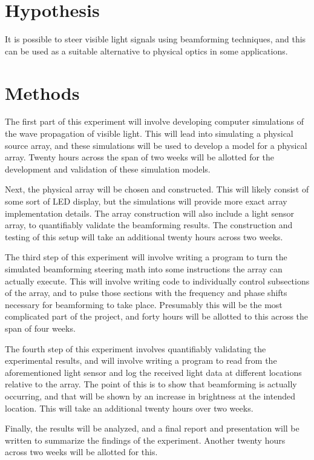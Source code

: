 \documentclass[12pt]{article}
\begin{document}
\section{Hypothesis}
It is possible to steer visible light signals using beamforming techniques, 
and this can be used as a suitable alternative to physical optics in some applications.

\section{Methods}
The first part of this experiment will involve developing computer simulations of the 
wave propagation of visible light. This will lead into simulating a physical source
array, and these simulations will be used to develop a model for a physical array. Twenty
hours across the span of two weeks will be allotted for the development and validation of 
these simulation models. 
\par
Next, the physical array will be chosen and constructed. This will likely consist of some sort of
LED display, but the simulations will provide more exact array implementation details. The 
array construction will also include a light sensor array\cite{Analog_Devices}, to quantifiably validate the 
beamforming results. The construction and testing of this setup will take an additional 
twenty hours across two weeks. 
\par
The third step of this experiment will involve writing a program to turn the simulated
beamforming steering math into some instructions the array can actually execute. This 
will involve writing code to individually control subsections of the array, and to pulse
those sections with the frequency and phase shifts necessary for beamforming to take place.
Presumably this will be the most complicated part of the project, and forty hours will be
allotted to this across the span of four weeks.
\par
The fourth step of this experiment involves quantifiably validating the experimental results,
and will involve writing a program to read from the aforementioned light sensor and log the 
received light data at different locations relative to the array. The point of this is to show
that beamforming is actually occurring, and that will be shown by an increase in brightness at 
the intended location. This will take an additional twenty hours over two weeks.
\par
Finally, the results will be analyzed, and a final report and presentation will be written to
summarize the findings of the experiment. Another twenty hours across two weeks will be allotted
for this.
\end{document}
